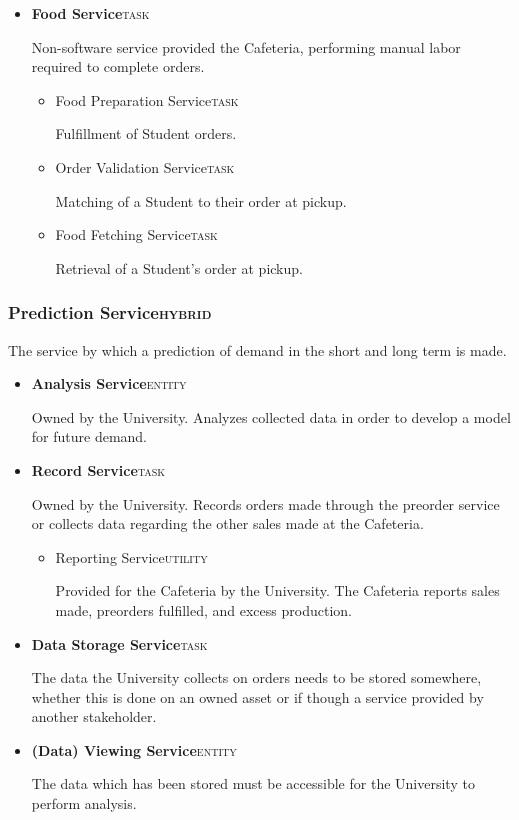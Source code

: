 \documentclass[11pt]{article}
\begin{document}
\begin{itemize}
\item \textbf{Food Service}\hfill{}\textsc{task}
\label{sec:org9bafc7e}

Non-software service provided the Cafeteria, performing manual
labor required to complete orders.

\begin{itemize}
\item Food Preparation Service\hfill{}\textsc{task}
\label{sec:orgba58b8a}

Fulfillment of Student orders.

\item Order Validation Service\hfill{}\textsc{task}
\label{sec:orgd624d0e}

Matching of a Student to their order at pickup.

\item Food Fetching Service\hfill{}\textsc{task}
\label{sec:orgb4ced6a}

Retrieval of a Student's order at pickup.
\end{itemize}
\end{itemize}

\subsubsection*{Prediction Service\hfill{}\textsc{hybrid}}
\label{sec:org82466bd}
The service by which a prediction of demand in the short and long
term is made.
\begin{itemize}
\item \textbf{Analysis Service}\hfill{}\textsc{entity}
\label{sec:orga7bdfce}

Owned by the University. Analyzes collected data in order to
develop a model for future demand.

\item \textbf{Record Service}\hfill{}\textsc{task}
\label{sec:org4920492}

Owned by the University. Records orders made through the preorder
service or collects data regarding the other sales made at the
Cafeteria.

\begin{itemize}
\item Reporting Service\hfill{}\textsc{utility}
\label{sec:org7ea44fa}

Provided for the Cafeteria by the University. The Cafeteria
reports sales made, preorders fulfilled, and excess production.
\end{itemize}

\item \textbf{Data Storage Service}\hfill{}\textsc{task}
\label{sec:org5cdd61d}

The data the University collects on orders needs to be stored
somewhere, whether this is done on an owned asset or if though a
service provided by another stakeholder.

\item \textbf{(Data) Viewing Service}\hfill{}\textsc{entity}
\label{sec:org76e517e}

The data which has been stored must be accessible for the
University to perform analysis.
\end{itemize}
\end{document}
